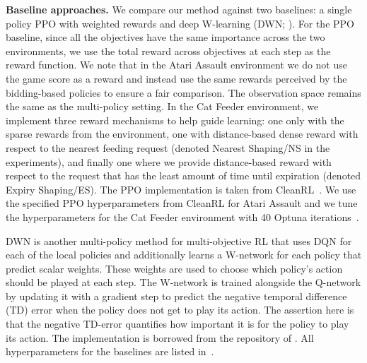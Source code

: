 \textbf{Baseline approaches.}
We compare our method against two baselines: a single policy PPO with weighted rewards and deep W-learning (DWN; \citet{rosero2024multi}). 
For the PPO baseline, since all the objectives have the same importance across the two environments, we use the total reward across objectives at each step as the reward function.
We note that in the Atari Assault environment we do not use the game score as a reward and instead use the same rewards perceived by the bidding-based policies to ensure a fair comparison.
The observation space remains the same as the multi-policy setting. 
In the Cat Feeder environment, we implement three reward mechanisms to help guide learning: one only with the sparse rewards from the environment, one with distance-based dense reward with respect to the nearest feeding request (denoted Nearest Shaping/NS in the experiments), and finally one where we provide distance-based reward with respect to the request that has the least amount of time until expiration (denoted Expiry Shaping/ES).
The PPO implementation is taken from CleanRL~\citep{huang2022cleanrl}.
We use the specified PPO hyperparameters from CleanRL for Atari Assault and we tune the hyperparameters for the Cat Feeder environment with 40 Optuna iterations~\citep{akiba2019optuna}.

DWN is another multi-policy method for multi-objective RL that uses DQN for each of the local policies and additionally learns a W-network for each policy that predict scalar weights. 
These weights are used to choose which policy's action should be played at each step. 
The W-network is trained alongside the Q-network by updating it with a gradient step to predict the negative temporal difference (TD) error when the policy does not get to play its action.
The assertion here is that the negative TD-error quantifies how important it is for the policy to play its action. 
The implementation is borrowed from the repository of \citet{rosero2024multi}. All hyperparameters for the baselines are listed in~.